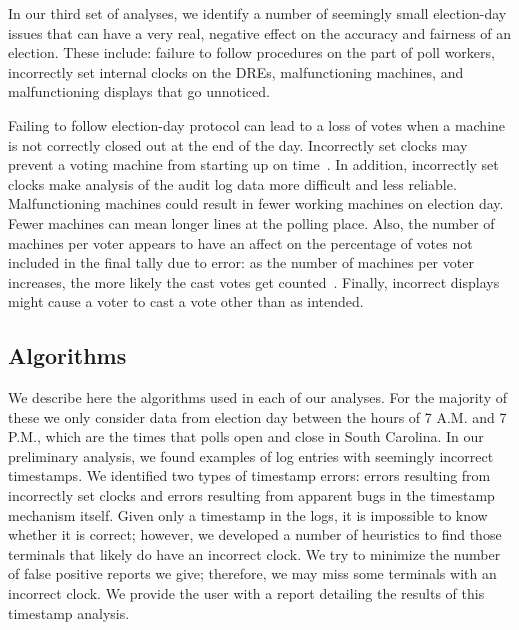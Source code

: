 \documentclass[letterpaper,twocolumn,10pt]{article}
\begin{document}

In our third set of analyses, we identify a number of seemingly small
election-day issues that can have a very real, negative effect on the accuracy
and fairness of an election. These include:
failure to follow procedures on the part of poll workers, incorrectly set
internal clocks on the DREs, malfunctioning machines, and malfunctioning
displays that go unnoticed.  

Failing to follow election-day protocol can lead to a loss of votes when a
machine is not correctly closed out at the end of the day. Incorrectly set
clocks may prevent a voting machine from starting up on
time~\cite{VotUn2007}. In addition, incorrectly set clocks make analysis of the
audit log data more difficult and less reliable. Malfunctioning machines could
result in fewer working machines on election day. Fewer machines can mean longer
lines at the polling place. Also, the number of machines per voter appears to have an 
affect on the percentage of votes not included in the final tally due to error: 
as the number of machines per voter increases, the more likely the cast votes 
get counted~\cite{DNC2005}. Finally,
incorrect displays might cause a voter to cast a vote other than as intended.
 
\subsection{Algorithms}
We describe here the algorithms used in each of our analyses. For the
majority of these we only consider data from election day between the hours of
7 A.M. and 7 P.M., which are the times that polls open and close in South
Carolina. In our preliminary analysis, we found examples of log entries with
seemingly incorrect timestamps. We identified two types of timestamp errors:
errors resulting from incorrectly set clocks and errors resulting from apparent
bugs in the timestamp mechanism itself. Given only a timestamp in the logs, it
is impossible to know whether it is correct; however, we developed a number of
heuristics to find those terminals that likely do have an incorrect clock. We
try to minimize the number of false positive reports we give; therefore, we
may miss some terminals with an incorrect clock. We provide the user with a report detailing the
results of this timestamp analysis. 
\end{document}
